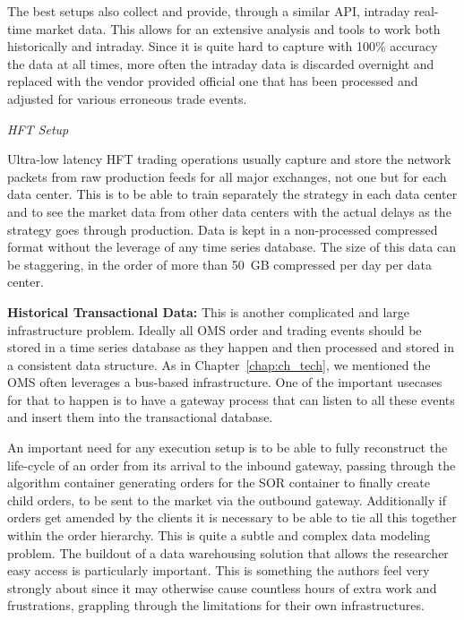 The best setups also collect and provide, through a similar API, intraday real-time market data. This allows for an extensive analysis and tools to work both historically and intraday. Since it is quite hard to capture with 100\% accuracy the data at all times, more often the intraday data is discarded overnight and replaced with the vendor provided official one that has been processed and adjusted for various erroneous trade events. \twomedskip



\pagebreak



\noindent\emph{HFT Setup} \twomedskip

Ultra-low latency HFT trading operations usually capture and store the network packets from raw production feeds for all major exchanges, not one but for each data center. This is to be able to train separately the strategy in each data center and to see the market data from other data centers with the actual delays as the strategy goes through production. Data is kept in a non-processed compressed format without the leverage of any time series database. The size of this data can be staggering, in the order of more than 50~GB compressed per day per data center. \twomedskip


\noindent\textbf{Historical Transactional Data:} This is another complicated and large infrastructure problem. Ideally all OMS order and trading events should be stored in a time series database as they happen and then processed and stored in a consistent data structure. As in Chapter~\ref{chap:ch_tech}, we mentioned the OMS often leverages a bus-based infrastructure. One of the important usecases for that to happen is to have a gateway process that can listen to all these events and insert them into the transactional database.


An important need for any execution setup is to be able to fully reconstruct the life-cycle of an order from its arrival to the inbound gateway, passing through the algorithm container generating orders for the SOR container to finally create child orders, to be sent to the market via the outbound gateway. Additionally if orders get amended by the clients it is necessary to be able to tie all this together within the order hierarchy. This is quite a subtle and complex data modeling problem. The buildout of a data warehousing solution that allows the researcher easy access is particularly important. This is something the authors feel very strongly about since it may otherwise cause countless hours of extra work and frustrations, grappling through the limitations for their own infrastructures.


